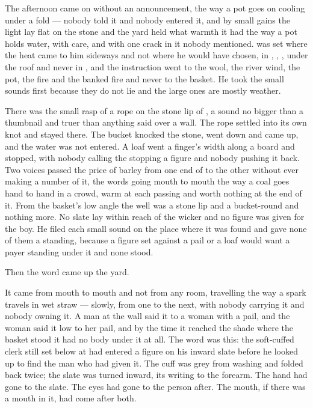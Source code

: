 The afternoon came on without an announcement, the way a pot goes on cooling under a fold --- nobody told it and nobody entered it, and by small gains the light lay flat on the stone and the yard held what warmth it had the way a pot holds water, with care, and with one crack in it nobody mentioned.  was set where the heat came to him sideways and not where he would have chosen, in , , , under the roof and never in , and the instruction went to the wool, the river wind, the pot, the fire and the banked fire and never to the basket. He took the small sounds first because they do not lie and the large ones are mostly weather.

There was the small rasp of a rope on the stone lip of , a sound no bigger than a thumbnail and truer than anything said over a wall. The rope settled into its own knot and stayed there. The bucket knocked the stone, went down and came up, and the water was not entered. A loaf went a finger's width along a board and stopped, with nobody calling the stopping a figure and nobody pushing it back. Two voices passed the price of barley from one end of  to the other without ever making a number of it, the words going mouth to mouth the way a coal goes hand to hand in a crowd, warm at each passing and worth nothing at the end of it. From the basket's low angle the well was a stone lip and a bucket-round and nothing more. No slate lay within reach of the wicker and no figure was given for the boy. He filed each small sound on the place where it was found and gave none of them a standing, because a figure set against a pail or a loaf would want a payer standing under it and none stood.

Then the word came up the yard.

It came from mouth to mouth and not from any room, travelling the way a spark travels in wet straw --- slowly, from one to the next, with nobody carrying it and nobody owning it. A man at the wall said it to a woman with a pail, and the woman said it low to her pail, and by the time it reached the shade where the basket stood it had no body under it at all. The word was this: the soft-cuffed clerk still set below  at  had entered a figure on his inward slate before he looked up to find the man who had given it. The cuff was grey from washing and folded back twice; the slate was turned inward, its writing to the forearm. The hand had gone to the slate. The eyes had gone to the person after. The mouth, if there was a mouth in it, had come after both.

